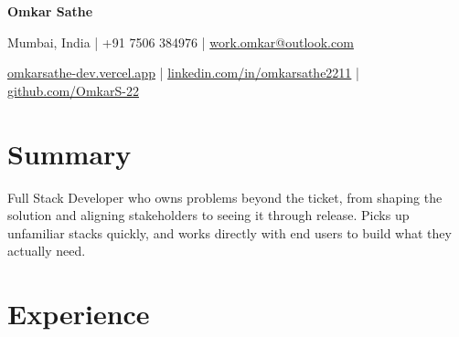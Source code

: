 \documentclass[a4paper,10pt]{article}
\newcommand{\name}[1]{\centerline{\huge \bfseries #1}}
\newcommand{\contact}[1]{\centerline{\small #1}}
\begin{document}

\name{Omkar Sathe}
\contact{Mumbai, India \quad | \quad +91 7506 384976 \quad | \quad \href{mailto:work.omkar@outlook.com}{work.omkar@outlook.com}}
\contact{\href{https://omkarsathe-dev.vercel.app}{omkarsathe-dev.vercel.app} \quad | \quad \href{https://linkedin.com/in/omkarsathe2211}{linkedin.com/in/omkarsathe2211} \quad | \quad \href{https://github.com/OmkarS-22}{github.com/OmkarS-22}}

\vspace{4pt}


\section*{Summary}

Full Stack Developer who owns problems beyond the ticket, from shaping the solution and aligning stakeholders to seeing it through release. Picks up unfamiliar stacks quickly, and works directly with end users to build what they actually need.


\section*{Experience}
\end{document}
